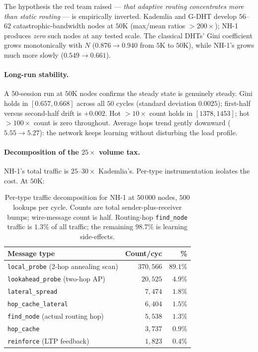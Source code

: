 \documentclass[conference]{IEEEtran}
\newcommand{\nhone}{NH-1\xspace}
\newcommand{\GDHT}{G-DHT\xspace}
\begin{document}
The hypothesis the red team raised --- \emph{that adaptive routing
concentrates more than static routing} --- is empirically
inverted. Kademlia and \GDHT develop $56$--$62$ catastrophic-bandwidth
nodes at $50\mathrm{K}$ (max/mean ratios $> 200\times$); \nhone
produces \emph{zero} such nodes at any tested scale. The classical
DHTs' Gini coefficient grows monotonically with $N$ ($0.876
\rightarrow 0.940$ from $5\mathrm{K}$ to $50\mathrm{K}$), while
\nhone's grows much more slowly ($0.549 \rightarrow 0.661$).

\paragraph{Long-run stability.} A $50$-session run at $50\mathrm{K}$
nodes confirms the steady state is genuinely steady. Gini holds in
$[0.657, 0.668]$ across all $50$ cycles (standard deviation
$0.0025$); first-half versus second-half drift is $+0.002$. Hot
$>10\times$ count holds in $[1378, 1453]$; hot $>100\times$ count is
zero throughout. Average hops trend gently downward
($5.55 \rightarrow 5.27$): the network keeps learning without
disturbing the load profile.

\paragraph{Decomposition of the $25\times$ volume tax.} \nhone's
total traffic is $25$--$30\times$ Kademlia's. Per-type
instrumentation isolates the cost. At $50\mathrm{K}$:

\begin{table}[t]
\centering
\caption{Per-type traffic decomposition for \nhone at
$50\,000$ nodes, $500$ lookups per cycle. Counts are total
sender-plus-receiver bumps; wire-message count is half. Routing-hop
\texttt{find\_node} traffic is $1.3\%$ of all traffic; the remaining
$98.7\%$ is learning side-effects.}
\label{tab:bandwidth-types}
\small
\begin{tabular}{@{}lrr@{}}
\toprule
\textbf{Message type} & \textbf{Count/cyc} & \textbf{\%} \\
\midrule
\texttt{local\_probe} (2-hop annealing scan) & $370{,}566$ &
$\mathbf{89.1\%}$ \\
\texttt{lookahead\_probe} (two-hop AP) & $20{,}525$ & $4.9\%$ \\
\texttt{lateral\_spread} & $7{,}474$ & $1.8\%$ \\
\texttt{hop\_cache\_lateral} & $6{,}404$ & $1.5\%$ \\
\texttt{find\_node} (actual routing hop) & $5{,}538$ & $1.3\%$ \\
\texttt{hop\_cache} & $3{,}737$ & $0.9\%$ \\
\texttt{reinforce} (LTP feedback) & $1{,}823$ & $0.4\%$ \\
\bottomrule
\end{tabular}
\end{table}
\end{document}
